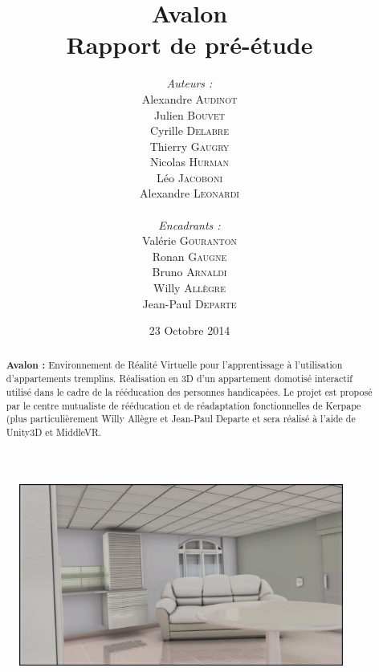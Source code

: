 \documentclass[a4paper,11pt]{article}
\title{
  \textbf{Avalon}\\
  Rapport de pré-étude
}
\author{
\begin{minipage}{0.4\textwidth}
	\begin{flushleft} \large
		\emph{Auteurs :}\\
		Alexandre \textsc{Audinot}\\
		Julien \textsc{Bouvet}\\
		Cyrille \textsc{Delabre}\\
		Thierry \textsc{Gaugry}\\
		Nicolas \textsc{Hurman}\\
		Léo \textsc{Jacoboni}\\
		Alexandre \textsc{Leonardi}\\
	\end{flushleft}
\end{minipage}
\begin{minipage}{0.4\textwidth}
	\begin{flushright} \large
		\emph{Encadrants :} \\
		Valérie \textsc{Gouranton}\\
		Ronan \textsc{Gaugne}\\
		Bruno \textsc{Arnaldi}\\
		Willy \textsc{Allègre}\\
		Jean-Paul  \textsc{Departe}\\
	\end{flushright}
\end{minipage}
}
\date{23 Octobre 2014}
\begin{document}
\maketitle
\thispagestyle{empty}
\begin{abstract}
\textbf{Avalon :} Environnement de Réalité Virtuelle pour l'apprentissage à l'utilisation d'appartements tremplins. Réalisation en 3D d'un appartement domotisé interactif utilisé dans le cadre de la rééducation des personnes handicapées.
Le projet est proposé par le centre mutualiste de rééducation et de réadaptation fonctionnelles de Kerpape (plus particulièrement Willy Allègre et Jean-Paul Departe et sera réalisé à l'aide de Unity3D et MiddleVR.
\end{abstract}

\begin{figure}[h!]
	\centering
	\includegraphics[height=170pt]{1-PreEtude/img/screen_appart.png}
\end{figure}

\end{document}
